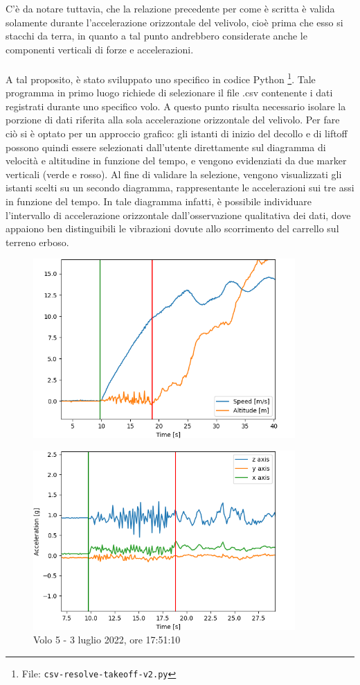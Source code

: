 \documentclass[12pt]{article}
\begin{document}
C'è da notare tuttavia, che la relazione precedente per come è scritta è valida solamente durante l'accelerazione orizzontale del velivolo, cioè prima che esso si stacchi da terra, in quanto a tal punto andrebbero considerate anche le componenti verticali di forze e accelerazioni.
\\\\
\noindent
A tal proposito, è stato sviluppato uno specifico in codice Python \footnote{File: \texttt{csv-resolve-takeoff-v2.py}}. Tale programma in primo luogo richiede di selezionare il file .csv contenente i dati registrati durante uno specifico volo. A questo punto risulta necessario isolare la porzione di dati riferita alla sola accelerazione orizzontale del velivolo. Per fare ciò si è optato per un approccio grafico: gli istanti di inizio del decollo e di liftoff possono quindi essere selezionati dall'utente direttamente sul diagramma di velocità e altitudine in funzione del tempo, e vengono evidenziati da due marker verticali (verde e rosso).
Al fine di validare la selezione, vengono visualizzati gli istanti scelti su un secondo diagramma, rappresentante le accelerazioni sui tre assi in funzione del tempo. In tale diagramma infatti, è possibile individuare l'intervallo di accelerazione orizzontale dall'osservazione qualitativa dei dati, dove appaiono ben distinguibili le vibrazioni dovute allo scorrimento del carrello sul terreno erboso.

\begin{figure}[H]
	\centering
	\includegraphics[width=10cm]{img/select-to-1}
\end{figure}

\vspace{-0.5cm}

\begin{figure}[H]
	\centering
	\includegraphics[width=10cm]{img/select-to-2}
	\captionsetup{labelformat=empty}
	\caption{Volo 5 - 3 luglio 2022, ore 17:51:10}
\end{figure}
\end{document}
